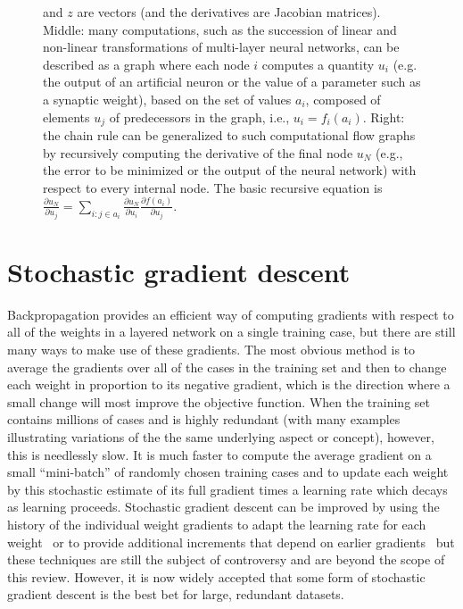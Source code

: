 \documentclass[]{article}
\begin{document}
\begin{figure}[H]
{and $z$ are vectors (and the derivatives are Jacobian matrices). \newline
Middle: many computations, such as the succession of linear and non-linear 
transformations of multi-layer neural networks, can be described as
a graph where each node $i$ computes a quantity $u_i$ (e.g. the
output of an artificial neuron or the value of a parameter such as
a synaptic weight), based on the set of values $a_i$, composed of elements $u_j$ of
predecessors in the graph, i.e., $u_i = f_i(a_i)$. \newline
Right: the chain rule can be generalized to such computational
flow graphs by recursively computing the derivative of the final
node $u_N$ (e.g., the error to be minimized or the output of the neural network)
with respect to every internal node. The basic recursive equation
is
$\frac{\partial u_N}{\partial u_j} = \sum_{i: j \in a_i} \frac{\partial u_N}{\partial u_i}
\frac{\partial f(a_i)}{\partial u_j}.$
}
\label{fig:backprop-box}
\end{figure}


\section{Stochastic gradient descent}

Backpropagation provides an efficient way of computing gradients with respect to all of
the weights in a layered network on a single training case, but there are
still many ways to make use of these gradients. The most obvious method is
to average the gradients over all of the cases in the training set and then
to change each weight in proportion to its negative gradient, which is the
direction where a small change will most improve the objective function. 
When the training set contains millions of cases and is highly redundant
(with many examples illustrating variations of the the same underlying 
aspect or concept), however,
this is needlessly slow. It is much faster to compute the average gradient
on a small ``mini-batch'' of randomly chosen training cases and to update
each weight by this stochastic estimate of its full gradient times a
learning rate which decays as learning proceeds. Stochastic gradient
descent can be improved by using the history of the individual weight
gradients to adapt the learning rate for each weight~\citep{bottou-bousquet-2008-small}
or to provide additional increments that depend on earlier gradients~\citep{momentum}
but these techniques are still the subject of controversy and are beyond
the scope of this review.  However, it is now widely accepted that some
form of stochastic gradient descent is the best bet for large, redundant
datasets.
\end{document}
